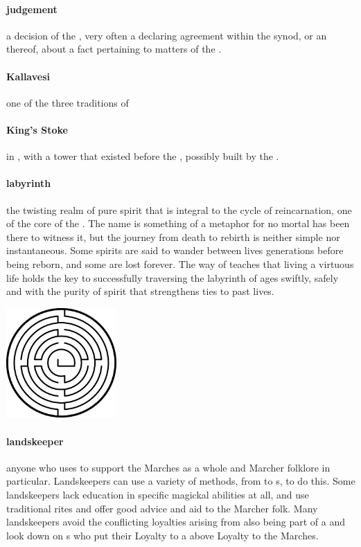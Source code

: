 \paragraph{judgement} a decision of the , very often a  declaring agreement within the synod, or an  thereof, about a fact pertaining to matters of the .
\paragraph{Kallavesi} one of the three traditions of 
\paragraph{King's Stoke}  in , with a tower that existed before the , possibly built by the .
\paragraph{labyrinth}the twisting realm of pure spirit that is integral to the cycle of reincarnation, one of the core  of the . The name is something of a metaphor for no mortal has been there to witness it, but the journey from death to rebirth is neither simple nor instantaneous. Some spirits are said to wander between lives generations before being reborn, and some are lost forever. The way of  teaches that living a virtuous life holds the key to successfully traversing the labyrinth of ages swiftly, safely and with the purity of spirit that strengthens ties to past lives. \begin{center}\includegraphics[width=4.2cm]{encyclopedia/Labyrinth} \end{center}
\paragraph{landskeeper} anyone who uses  to support the Marches as a whole and Marcher folklore in particular. Landskeepers can use a variety of methods, from  to s, to do this. Some landskeepers lack education in specific magickal abilities at all, and use traditional rites and offer good advice and aid to the Marcher folk. Many landskeepers avoid the conflicting loyalties arising from also being part of a  and look down on s who put their Loyalty to a  above Loyalty to the Marches.
